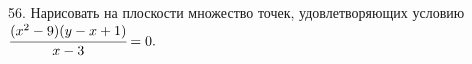 56. Нарисовать на плоскости множество точек, удовлетворяющих условию
$\cfrac{(x^2-9)(y-x+1)}{x-3}=0.$\\
